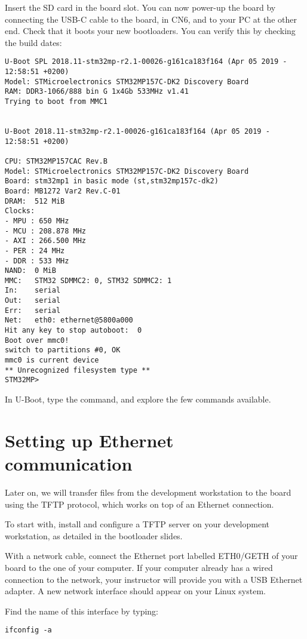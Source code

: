 Insert the SD card in the board slot. You can now power-up the board
by connecting the USB-C cable to the board, in CN6,  and
to your PC at the other end. Check that it boots your new bootloaders.
You can verify this by checking the build dates:

\begin{verbatim}
U-Boot SPL 2018.11-stm32mp-r2.1-00026-g161ca183f164 (Apr 05 2019 - 12:58:51 +0200)
Model: STMicroelectronics STM32MP157C-DK2 Discovery Board
RAM: DDR3-1066/888 bin G 1x4Gb 533MHz v1.41
Trying to boot from MMC1


U-Boot 2018.11-stm32mp-r2.1-00026-g161ca183f164 (Apr 05 2019 - 12:58:51 +0200)

CPU: STM32MP157CAC Rev.B
Model: STMicroelectronics STM32MP157C-DK2 Discovery Board
Board: stm32mp1 in basic mode (st,stm32mp157c-dk2)
Board: MB1272 Var2 Rev.C-01
DRAM:  512 MiB
Clocks:
- MPU : 650 MHz
- MCU : 208.878 MHz
- AXI : 266.500 MHz
- PER : 24 MHz
- DDR : 533 MHz
NAND:  0 MiB
MMC:   STM32 SDMMC2: 0, STM32 SDMMC2: 1
In:    serial
Out:   serial
Err:   serial
Net:   eth0: ethernet@5800a000
Hit any key to stop autoboot:  0
Boot over mmc0!
switch to partitions #0, OK
mmc0 is current device
** Unrecognized filesystem type **
STM32MP>
\end{verbatim}

In U-Boot, type the  command, and explore the few commands
available.

\section{Setting up Ethernet communication}

Later on, we will transfer files from the development workstation to
the board using the TFTP protocol, which works on top of an Ethernet
connection.

To start with, install and configure a TFTP server on your development
workstation, as detailed in the bootloader slides.

With a network cable, connect the Ethernet port labelled ETH0/GETH of
your board to the one of your computer. If your computer already has a
wired connection to the network, your instructor will provide you with
a USB Ethernet adapter. A new network interface should appear on your
Linux system.

Find the name of this interface by typing:
\begin{verbatim}
ifconfig -a
\end{verbatim}

